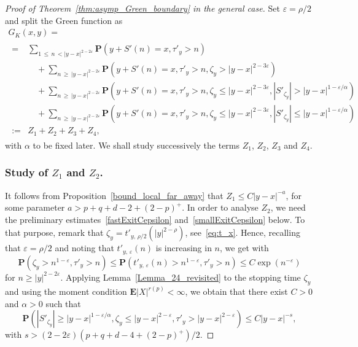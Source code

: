 \documentclass[10pt]{amsart}
\theoremstyle{definition}\newtheorem{defi}[theo]{Definition}\newtheorem{rema}[theo]{Remark}\newtheorem{exam}[theo]{Example}\newtheorem{exem}[theo]{Example}\newtheorem{nota}[theo]{Notation}
\newcommand{\pr}{\mathbf{P}}
\newcommand{\e}{\mathbf{E}}
\renewcommand{\epsilon}{\varepsilon}
\renewcommand{\leq}{\leqslant}
\renewcommand{\geq}{\geqslant}
\begin{document}
\begin{proof}[Proof of Theorem~\ref{thm:asymp_Green_boundary} in the general case]
Set $\epsilon=\rho/2$ and split the Green function as
\begin{multline*}
G_K(x,y)=\\
\begin{aligned}
=& \sum_{1\,\leq\,n\,<|y-x|^{2-2\epsilon}}\pr\left(y+S'(n)=x,\tau'_{y}>n\right)\\
&\quad+\sum_{n\,\geq\,| y-x|^{2-2\epsilon}}\pr\left(y+S'(n)=x,\tau'_{y}>n,\zeta_{y}> | y-x|^{2-3\epsilon}\right)\\
&\quad+\sum_{n\,\geq\,|y-x|^{2-2\epsilon}}\pr\left(y+S'(n)=x,\tau'_{y}>n,\zeta_{y}\leq | y-x|^{2-3\epsilon},\left|S'_{\zeta_{y}}\right|> |y-x|^{1-\epsilon/\alpha}\right)\\
&\quad+\sum_{n\,\geq\,|y-x|^{2-2\epsilon}}\pr\left(y+S'(n)=x,\tau'_{y}>n,\zeta_{y}\leq |y-x|^{2-3\epsilon},\left|S'_{\zeta_{y}}\right| \leq |y-x|^{1-\epsilon/\alpha}\right)\\
:=& Z_{1}+Z_{2}+Z_{3}+Z_{4},
\end{aligned}
\end{multline*}
with $\alpha$ to be fixed later. We shall study successively the terms $Z_1$, $Z_2$, $Z_3$ and $Z_4$.



\subsubsection*{Study of \texorpdfstring{$Z_1$}{Z1} and \texorpdfstring{$Z_2$}{Z2}.}

It follows from Proposition~\ref{bound_local_far_away} that $Z_{1}\leq C| y-x|^{-a}$, for some parameter $a>p+q+d-2+(2-p)^{+}$. In order to analyse $Z_2$, we need the preliminary estimates~\eqref{fastExitCepsilon} and~\eqref{smallExitCepsilon} below. To that purpose, remark that $\zeta_{y}=t'_{y,\,\rho/2}(|y|^{2-\rho})$, see~\eqref{eq:t_x}. Hence, recalling that $\epsilon=\rho/2$ and noting that $t'_{y,\,\epsilon}(n)$ is increasing in $n$, we get with~\cite[Lemma~14]{DeWa-15}
\begin{equation}\label{fastExitCepsilon}
\pr\left(\zeta_{y}>n^{1-\epsilon}, \tau'_{y}> n\right)\leq \pr\left(t'_{y,\,\epsilon}(n)>n^{1-\epsilon}, \tau'_{y}> n\right) \leq C\exp\left(n^{-\epsilon}\right)
\end{equation}
for $n\geq |y|^{2-2\epsilon}$. Applying Lemma~\ref{Lemma_24_revisited} to the stopping time $\zeta_{y}$ and using the moment condition $\e|X|^{r(p)}<\infty$, we obtain that there exist $C>0$ and $\alpha>0$ such that
\begin{equation}\label{smallExitCepsilon}
\pr\left(\left|S'_{\zeta_{y}}\right| \geq |y-x|^{1-\epsilon/\alpha},\zeta_{y}\leq | y-x|^{2-\epsilon}, \tau'_{y}> | y-x|^{2-\epsilon}\right)\leq C|y-x|^{-s},
\end{equation}
with $s>(2-2\epsilon)(p+q+d-4+(2-p)^{+})/2$.


\end{proof}
\end{document}
